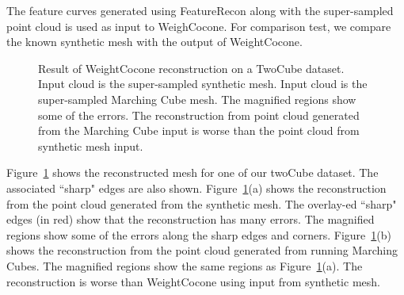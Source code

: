 The feature curves generated using FeatureRecon along with the super-sampled point cloud is used as input to WeighCocone. For comparison test, we compare the known synthetic mesh with the output of WeightCocone.  
\begin{figure}[t] 
	\centering 
	\caption{Result of WeightCocone reconstruction on a TwoCube dataset. \protect{} Input cloud is the super-sampled synthetic mesh. \protect{} Input cloud is the super-sampled Marching Cube mesh. The magnified regions show some of the errors. The reconstruction from point cloud generated from the Marching Cube input is worse than the  point cloud from synthetic mesh input. }
	\label{fig:cocone_compare_from_perfect_1}
	\vskip-0.2cm
\end{figure} 

Figure~\ref{fig:cocone_compare_from_perfect_1} shows the reconstructed mesh for one of our twoCube dataset. The associated ``sharp" edges are also shown. Figure~\ref{fig:cocone_compare_from_perfect_1}(a) shows the reconstruction from the point cloud generated from the synthetic mesh. The overlay-ed ``sharp" edges (in red) show that the reconstruction has many errors. The magnified regions show some of the errors along the sharp edges and corners. Figure~\ref{fig:cocone_compare_from_perfect_1}(b) shows the reconstruction from the point cloud generated from running Marching Cubes. The magnified regions show the same regions as Figure~\ref{fig:cocone_compare_from_perfect_1}(a). The reconstruction is worse than WeightCocone using input from synthetic mesh. 

